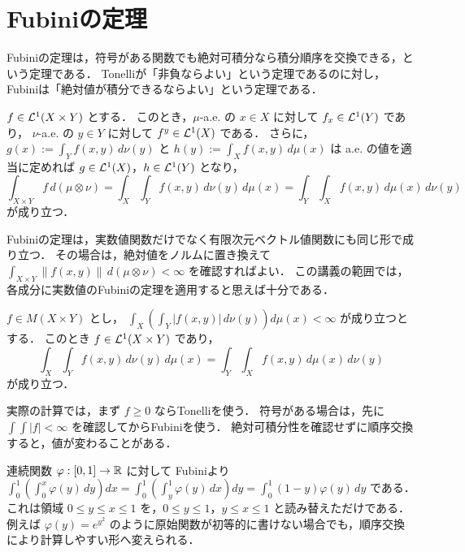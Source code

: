 \section{Fubiniの定理}

Fubiniの定理は，符号がある関数でも絶対可積分なら積分順序を交換できる，という定理である．
Tonelliが「非負ならよい」という定理であるのに対し，Fubiniは「絶対値が積分できるならよい」という定理である．

\begin{theorem}[Fubiniの定理]\label{thm:fubini}
$f\in\mathcal L^1(X\times Y)$ とする．
このとき，$\mu$-a.e. の $x\in X$ に対して $f_x\in\mathcal L^1(Y)$ であり，
$\nu$-a.e. の $y\in Y$ に対して $f^y\in\mathcal L^1(X)$ である．
さらに，$g(x):=\int_Y f(x,y)\,d\nu(y)$ と $h(y):=\int_X f(x,y)\,d\mu(x)$ は
a.e. の値を適当に定めれば $g\in\mathcal L^1(X)$，$h\in\mathcal L^1(Y)$ となり，
\[
\int_{X\times Y} f\,d(\mu\otimes\nu)=\int_X\!\int_Y f(x,y)\,d\nu(y)\,d\mu(x)=\int_Y\!\int_X f(x,y)\,d\mu(x)\,d\nu(y)
\]
が成り立つ．
\end{theorem}

\begin{remark}[ベクトル値の場合]
Fubiniの定理は，実数値関数だけでなく有限次元ベクトル値関数にも同じ形で成り立つ．
その場合は，絶対値をノルムに置き換えて
$\int_{X\times Y}\|f(x,y)\|\,d(\mu\otimes\nu)<\infty$
を確認すればよい．
この講義の範囲では，各成分に実数値のFubiniの定理を適用すると思えば十分である．
\end{remark}

\begin{corollary}[積分順序の交換判定]\label{cor:iterated-integral-exchange}
$f\in M(X\times Y)$ とし，
$\int_X(\int_Y |f(x,y)|\,d\nu(y))d\mu(x)<\infty$ が成り立つとする．
このとき $f\in\mathcal L^1(X\times Y)$ であり，
\[
\int_X\!\int_Y f(x,y)\,d\nu(y)\,d\mu(x)=\int_Y\!\int_X f(x,y)\,d\mu(x)\,d\nu(y)
\]
が成り立つ．
\end{corollary}

\begin{remark}[確認の順番]
実際の計算では，まず $f\ge0$ ならTonelliを使う．
符号がある場合は，先に $\int\int |f|<\infty$ を確認してからFubiniを使う．
絶対可積分性を確認せずに順序交換すると，値が変わることがある．
\end{remark}

\begin{example}[積分領域の入れ替え]\label{ex:change-order-triangle}
連続関数 $\varphi:[0,1]\to\mathbb R$ に対して
Fubiniより $\int_0^1(\int_0^x \varphi(y)\,dy)dx=\int_0^1(\int_y^1 \varphi(y)\,dx)dy=\int_0^1(1-y)\varphi(y)\,dy$ である．
これは領域 $0\le y\le x\le1$ を，$0\le y\le1$，$y\le x\le1$ と読み替えただけである．
例えば $\varphi(y)=e^{y^2}$ のように原始関数が初等的に書けない場合でも，順序交換により計算しやすい形へ変えられる．
\end{example}


